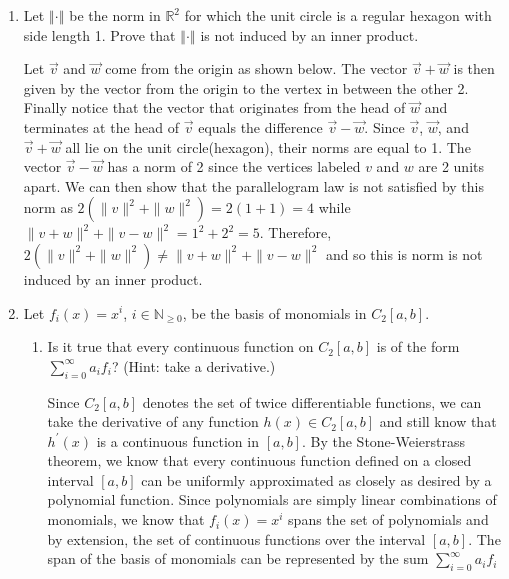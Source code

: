 \documentclass[12pt,letterpaper,reqno]{amsart}
\newcommand{\R}{\mathbb R}
\newcommand{\N}{\mathbb N}
\newcommand{\Norm}[1]{\left\Vert #1 \right \Vert}
\begin{document}
\begin{enumerate}[1.]
\item Let $\Norm{\cdot}$ be the norm in $\R^2$ for which the unit circle is a regular hexagon with side length 1. Prove that $\Norm{\cdot}$ is not induced by an inner product.
\begin{flushleft}
Let $\vec{v}$ and $\vec{w}$ come from the origin as shown below. The vector $\vec{v}+\vec{w}$ is then given by the vector from the origin to the vertex in between the other 2. Finally notice that the vector that originates from the head of $\vec{w}$ and terminates at the head of $\vec{v}$ equals the difference $\vec{v} - \vec{w}$. Since $\vec{v}$, $\vec{w}$, and $\vec{v}+\vec{w}$ all lie on the unit circle(hexagon), their norms are equal to 1. The vector $\vec{v} - \vec{w}$ has a norm of 2 since the vertices labeled $v$ and $w$ are 2 units apart. We can then show that the parallelogram law is not satisfied by this norm as $2(\|v\|^2 + \|w\|^2) = 2(1+1) = 4$ while $ \| v + w \|^2 + \| v - w \|^2 = 1^2 + 2^2 = 5$. Therefore,  $2(\|v\|^2 + \|w\|^2) \not= \|v + w\|^2 + \|v - w\|^2$ and so this is norm is not induced by an inner product.
\end{flushleft}
\begin{center}
\end{center}
\newpage
\item Let $f_i(x)=x^i$, $i\in \N_{\geq0}$, be the basis of monomials in $C_2[a,b]$.
\begin{enumerate}
\item Is it true that every continuous function on $C_2[a,b]$ is of the form $\sum_{i=0}^\infty a_if_i$? (Hint: take a derivative.)
\begin{flushleft}
Since $C_2[a,b]$ denotes the set of twice differentiable functions, we can take the derivative of any function $h(x) \in C_2[a,b]$ and still know that $h^\prime(x)$ is a continuous function in $[a,b]$. By the Stone-Weierstrass theorem, we know that every continuous function defined on a closed interval $[a, b]$ can be uniformly approximated as closely as desired by a polynomial function. Since polynomials are simply linear combinations of monomials, we know that $f_i(x)=x^i$ spans the set of polynomials and by extension, the set of continuous functions over the interval $[a,b]$. The span of the basis of monomials can be represented by the sum $\sum_{i=0}^\infty a_if_i$

\end{flushleft}
\end{enumerate}
\end{enumerate}
\end{document}
